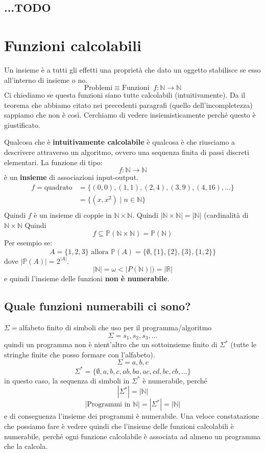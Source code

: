 \documentclass[a4paper]{article}
\begin{document}
\subsection{...TODO}


\section{Funzioni calcolabili}

Un insieme è a tutti gli effetti una proprietà che dato un oggetto
stabilisce se esso all'interno di insieme o no.
\[\text{Problemi} \equiv \text{Funzioni} \; \; f : \mathbb{N} \rightarrow \mathbb{N}\]
Ci chiediamo se questa funzioni siano tutte calcolabili (intuitivamente). Da il teorema che abbiamo citato
nei precedenti paragrafi (quello dell'incompletezza) sappiamo che non è così.
Cerchiamo di vedere insiemisticamente perché questo è giustificato.

{
Qualcosa che è \textbf{intuitivamente calcolabile} è qualcosa è che riusciamo a descrivere
attraverso un algoritmo, ovvero una sequenza finita di passi discreti elementari.
}
La funzione di tipo:
\[f : \mathbb{N} \rightarrow \mathbb{N}\]
è un \textbf{insieme} di associazioni input-output. 
\ex{}
{
    \[
    \begin{aligned}
        f = \text{quadrato} &= \{(0,0), (1,1), (2,4), (3,9), (4,16), ...\} \\
        &= \{(x,x^2) \; | \; n \in \mathbb{N} \} \\
    \end{aligned}   \]
    Quindi $f$ è un insieme di coppie in $\mathbb{N} \times \mathbb{N}$.
    Quindi $|\mathbb{N} \times \mathbb{N}| = |\mathbb{N}|$ (cardinalità di $\mathbb{N} \times \mathbb{N}$
    Quindi
    \[f \subseteq \mathbb{P}(\mathbb{N} \times \mathbb{N}) = \mathbb{P}(\mathbb{N})\]
    Per esempio se:
    \[A=\{1,2,3\} \text{ allora } \mathbb{P}(A) = \{\emptyset, \{1\}, \{2\}, \{3\}, \{1,2\}\}\]
    dove $|\mathbb{P}(A)| = 2^{|A|}$. 
    \[|\mathbb{N}| = \omega < |P(\mathbb{N})|) = |\mathbb{R}|\]
    e quindi l'insieme delle funzioni \textbf{non è numerabile}.
}
\subsection{Quale funzioni numerabili ci sono?}
$\Sigma = $alfabeto finito di simboli che uso per il programma/algoritmo
\[\Sigma = {s_1, s_2, s_3, \dots}\] 
quindi un programma non è nient'altro che un sottoinsieme finito di $\Sigma^*$ (tutte le stringhe finite che posso formare con l'alfabeto).
\[\Sigma = {a,b,c}\]
\[\Sigma^* = \{\emptyset, a,b,c,ab,ba,ac,cd,bc,cb,\dots\}\]
in questo caso, la sequenza di simboli in $\Sigma^*$ è numerabile, perché
\[|\Sigma^*| = |\mathbb{N}|\]
\[|\text{Programmi in }\mathbb{N}| = |\Sigma^*| = |\mathbb{N}|\]
e di conseguenza l'insieme dei programmi è numerabile.
Una veloce constatazione che possiamo fare è vedere quindi che l'insieme delle funzioni 
calcolabili è numerabile, perché ogni funzione calcolabile 
è associata ad almeno un programma che la calcola.
\end{document}
